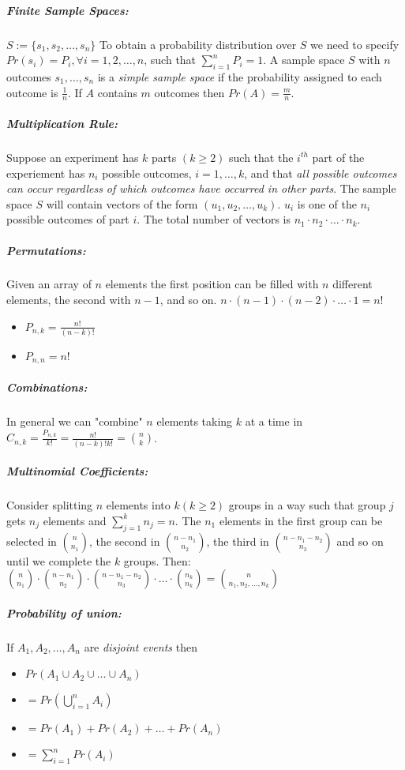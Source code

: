 \documentclass[landscape,10pt]{article}
\begin{document}
\begin{multicols}{3}
    \subparagraph*{Finite Sample Spaces: } 
        \(S := \{s_1, s_2, \dots, s_n \}\) To obtain a probability distribution over $S$ we need to specify \(Pr(s_i) = P_i, \forall i = 1, 2, \dots, n\), such that \(\sum\limits_{i=1}^{n}P_i = 1\). A sample space $S$ with $n$ outcomes $s_1, \ldots, s_n$ is a \textit{simple sample space} if the probability assigned to each outcome is $\frac{1}{n}$. If $A$ contains $m$ outcomes then \(Pr(A) = \frac{m}{n}\).

    \subparagraph*{Multiplication Rule: } 
        Suppose an experiment has $k$ parts \((k \geq 2)\) such that the $i^{th}$ part of the experiement has $n_i$ possible outcomes, $i = 1, \ldots, k$, and that \textit{all possible outcomes can occur regardless of which outcomes have occurred in other parts}. The sample space $S$ will contain vectors of the form $(u_1, u_2, \ldots, u_k)$. $u_i$ is one of the $n_i$ possible outcomes of part $i$. The total number of vectors is $n_1 \cdot n_2 \cdot \ldots \cdot n_k$.

    \subparagraph*{Permutations: } 
        Given an array of $n$ elements the first position can be filled with $n$ different elements, the second with $n-1$, and so on. $n \cdot (n-1) \cdot (n-2) \cdot \ldots \cdot 1 = n!$

        \begin{itemize}
            \item[] \(P_{n,k} = \frac{n!}{(n-k)!}\)
            \item[] \(P_{n,n} = n!\)
        \end{itemize}

    \subparagraph*{Combinations: }
        In general we can "combine" $n$ elements taking $k$ at a time in \(C_{n,k} = \frac{P_{n,k}}{k!} = \frac{n!}{(n-k)!k!} = {n \choose k} \). 

    \subparagraph*{Multinomial Coefficients: } 
        Consider splitting $n$ elements into $k (k \geq 2)$ groups in a way such that group $j$ gets $n_j$ elements and $\sum_{j = 1}^{k}n_j = n$. The $n_1$ elements in the first group can be selected in ${n \choose n_1}$, the second in ${n-n_1 \choose n_2}$, the third in ${n-n_1-n_2 \choose n_3}$ and so on until we complete the $k$ groups. Then: ${n \choose n_1}\cdot{n-n_1 \choose n_2}\cdot{n-n_1-n_2 \choose n_3}\cdot \ldots \cdot{n_k \choose n_k} = {n \choose n_1, n_2, \ldots, n_k}$

    \subparagraph*{Probability of union:}
        If $A_1, A_2, \ldots, A_n$ are \textit{disjoint events} then 
        \begin{itemize}
            \item[] $Pr(A_1 \cup A_2 \cup \ldots \cup A_n) $
            \item[] $= Pr(\bigcup\limits_{i=1}^{n}A_i) $
            \item[] $= Pr(A_1) + Pr(A_2) + \ldots + Pr(A_n) $
            \item[] $= \sum\limits_{i=1}^{n}Pr(A_i) $
        \end{itemize}


\end{multicols}
\end{document}
